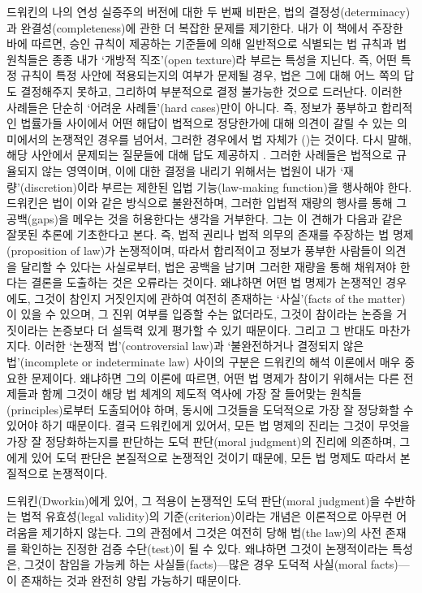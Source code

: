 드워킨의 나의 연성 실증주의 버전에 대한 두 번째 비판은, 법의
결정성(determinacy)과 완결성(completeness)에 관한 더 복잡한 문제를
제기한다. 내가 이 책에서 주장한 바에 따르면, 승인 규칙이 제공하는
기준들에 의해 일반적으로 식별되는 법 규칙과 법 원칙들은 종종 내가
`개방적 직조'(open texture)라 부르는 특성을 지닌다. 즉, 어떤 특정 규칙이
특정 사안에 적용되는지의 여부가 문제될 경우, 법은 그에 대해 어느 쪽의
답도 결정해주지 못하고, 그리하여 부분적으로 결정 불가능한 것으로
드러난다. 이러한 사례들은 단순히 `어려운 사례들'(hard cases)만이 아니다.
즉, 정보가 풍부하고 합리적인 법률가들 사이에서 어떤 해답이 법적으로
정당한가에 대해 의견이 갈릴 수 있는 의미에서의 논쟁적인 경우를 넘어서,
그러한 경우에서 법 자체가 ()는 것이다.
다시 말해, 해당 사안에서 문제되는 질문들에 대해  답도
제공하지 . 그러한 사례들은 법적으로 규율되지 않는 영역이며,
이에 대한 결정을 내리기 위해서는 법원이 내가 `재량'(discretion)이라
부르는 제한된 입법 기능(law-making function)을 행사해야 한다. 드워킨은
법이 이와 같은 방식으로 불완전하며, 그러한 입법적 재량의 행사를 통해 그
공백(gaps)을 메우는 것을 허용한다는 생각을 거부한다. 그는 이 견해가
다음과 같은 잘못된 추론에 기초한다고 본다. 즉, 법적 권리나 법적 의무의
존재를 주장하는 법 명제(proposition of law)가 논쟁적이며, 따라서
합리적이고 정보가 풍부한 사람들이 의견을 달리할 수 있다는 사실로부터,
법은 공백을 남기며 그러한 재량을 통해 채워져야 한다는 결론을 도출하는
것은 오류라는 것이다. 왜냐하면 어떤 법 명제가 논쟁적인 경우에도, 그것이
참인지 거짓인지에 관하여 여전히 존재하는 `사실'(facts of the matter)이
있을 수 있으며, 그 진위 여부를 입증할 수는 없더라도, 그것이 참이라는
논증을 거짓이라는 논증보다 더 설득력 있게 평가할 수 있기 때문이다.
그리고 그 반대도 마찬가지다. 이러한 `논쟁적 법'(controversial law)과
`불완전하거나 결정되지 않은 법'(incomplete or indeterminate law) 사이의
구분은 드워킨의 해석 이론에서 매우 중요한 문제이다. 왜냐하면 그의 이론에
따르면, 어떤 법 명제가 참이기 위해서는 다른 전제들과 함께 그것이 해당 법
체계의 제도적 역사에 가장 잘 들어맞는 원칙들(principles)로부터
도출되어야 하며, 동시에 그것들을 도덕적으로 가장 잘 정당화할 수 있어야
하기 때문이다. 결국 드워킨에게 있어서, 모든 법 명제의 진리는 그것이
무엇을 가장 잘 정당화하는지를 판단하는 도덕 판단(moral judgment)의
진리에 의존하며, 그에게 있어 도덕 판단은 본질적으로 논쟁적인 것이기
때문에, 모든 법 명제도 따라서 본질적으로 논쟁적이다.

드워킨(Dworkin)에게 있어, 그 적용이 논쟁적인 도덕 판단(moral judgment)을
수반하는 법적 유효성(legal validity)의 기준(criterion)이라는 개념은
이론적으로 아무런 어려움을 제기하지 않는다. 그의 관점에서 그것은 여전히
당해 법(the law)의 사전 존재를 확인하는 진정한 검증 수단(test)이 될 수
있다. 왜냐하면 그것이 논쟁적이라는 특성은, 그것이 참임을 가능케 하는
사실들(facts)---많은 경우 도덕적 사실(moral facts)---이 존재하는 것과
완전히 양립 가능하기 때문이다.

